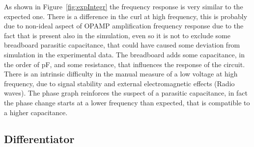 \documentclass[a4paper, twocolumn]{article}
\begin{document}
As shown in Figure~\ref{fig:expIntegr} the frequency response is very similar to the expected one. There is a difference in the curl at high frequency, this is probably due to non-ideal aspect of OPAMP amplification frequency response due to the fact that is present also in the simulation, even so it is not to exclude some breadboard parasitic capacitance, that could have caused some deviation from simulation in the experimental data. The breadboard adds some capacitance, in the order of \unit{\pico\farad}, and some resistance, that influences the response of the circuit. There is an intrinsic difficulty in the manual measure of a low voltage at high frequency, due to signal stability and external electromagnetic effects (Radio waves). The phase graph reinforces the suspect of a parasitic capacitance, in fact the phase change starts at a lower frequency than expected, that is compatible to a higher capacitance.

\subsection{Differentiator}
\end{document}
